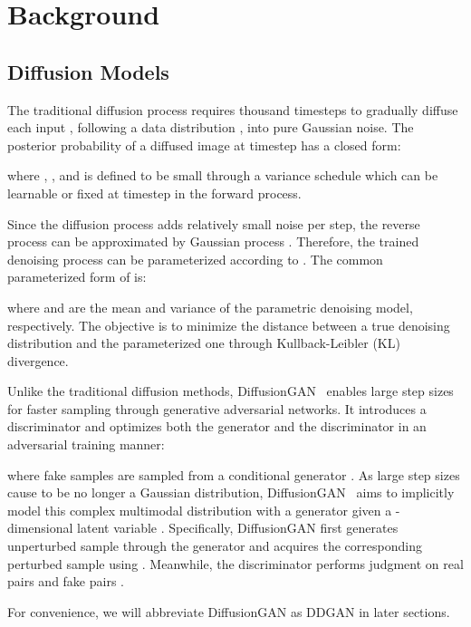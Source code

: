 \documentclass[10pt,twocolumn,letterpaper]{article}
\begin{document}
\section{Background}
\label{sec:background}

\subsection{Diffusion Models}
The traditional diffusion process requires thousand timesteps to gradually diffuse each input , following a data distribution , into pure Gaussian noise. The posterior probability of a diffused image  at timestep  has a closed form:

where , , and  is defined to be small through a variance schedule which can be learnable or fixed at timestep  in the forward process. 

Since the diffusion process adds relatively small noise per step, the reverse process  can be approximated by Gaussian process . Therefore, the trained denoising process  can be parameterized according to . The common parameterized form of  is:

where  and   are the mean and variance of the parametric denoising model, respectively. The objective is to minimize the distance between a true denoising distribution  and the parameterized one  through Kullback-Leibler (KL) divergence.



 Unlike the traditional diffusion methods, DiffusionGAN~\cite{xiao2021tackling} enables large step sizes for faster sampling through generative adversarial networks. It introduces a discriminator  and optimizes both the generator and the discriminator in an adversarial training manner:

where fake samples are sampled from a conditional generator . As large step sizes cause  to be no longer a Gaussian distribution, DiffusionGAN~\cite{xiao2021tackling} aims to implicitly model this complex multimodal distribution with a generator  given a -dimensional latent variable .
Specifically, DiffusionGAN first generates unperturbed sample  through the generator  and acquires the corresponding perturbed sample  using . Meanwhile, the discriminator performs judgment on real pairs  and fake pairs .

For convenience, we will abbreviate DiffusionGAN as DDGAN in later sections.
\end{document}
